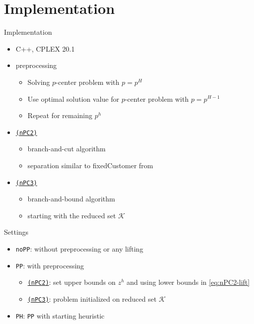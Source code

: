 \documentclass[utf8,aspectratio=169,ngerman,english]{beamer}
\renewcommand{\emph}[1]{\textcolor{jkuGreen}{#1}}
\newcommand{\nPCE}{\hyperref[eq:nPCE]{\texttt{(nPC3)}}\xspace}
\newcommand{\nPCY}{\hyperref[eq:nPCY]{\texttt{(nPC2)}}\xspace}
\newcommand{\noPP}{\texttt{noPP}\xspace}
\newcommand{\PP}{\texttt{PP}\xspace}
\newcommand{\sH}{\texttt{PH}\xspace}
\begin{document}
\section{Implementation}
\begin{frame}{Implementation}
    \begin{itemize}
        \item \emph{C++, CPLEX} 20.1 \pause
        \item \emph{preprocessing} \pause
        \begin{itemize}
            \item Solving \emph{$p$-center problem} with $p = p^H$
            \item Use optimal solution value for \emph{$p$-center problem} with $p = p^{H-1}$
            \item Repeat for remaining $p^h$
        \end{itemize}
        \item \nPCY \pause
        \begin{itemize}
            \item \emph{branch-and-cut} algorithm
            \item separation similar to \emph{fixedCustomer} from \cite{GAAR2022}
        \end{itemize} \pause
        \item \nPCE \pause
        \begin{itemize}
            \item \emph{branch-and-bound} algorithm
            \item starting with the \emph{reduced} set $\mathcal{K}$
        \end{itemize}
    \end{itemize}
\end{frame}
\begin{frame}{Settings}
    \begin{itemize}
        \setlength\itemsep{1em}
            \item \noPP: without \emph{preprocessing} or any \emph{lifting} \pause
            \item \PP: with \emph{preprocessing} \pause
            \begin{itemize}
                \item \nPCY: set upper bounds on $z^h$ and using lower bounds in \eqref{eq:nPC2-lift}
                \item \nPCE: problem initialized on reduced set $\mathcal{K}$ 
            \end{itemize}\pause
            \item \sH: \PP with \emph{starting heuristic}
    \end{itemize}
\end{frame}
\end{document}
